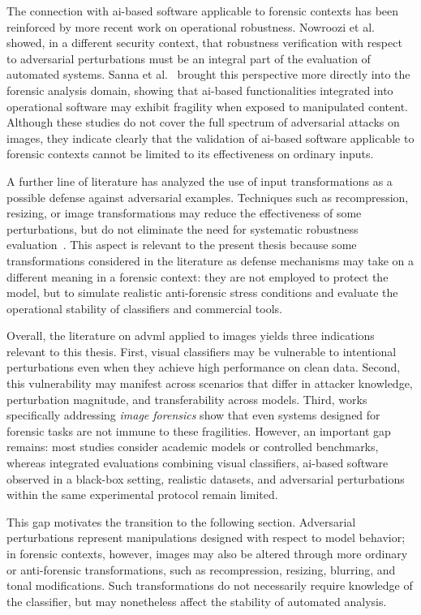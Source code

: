 The connection with \gls{ai}-based software applicable to forensic contexts has
been reinforced by more recent work on operational robustness. Nowroozi et
al.~\cite{nowroozi2024verifying} showed, in a different security context, that
robustness verification with respect to adversarial perturbations must be an
integral part of the evaluation of automated systems. Sanna et
al.~\cite{sanna2024preliminary,sanna2025pixelperfect} brought this perspective
more directly into the forensic analysis domain, showing that \gls{ai}-based
functionalities integrated into operational software may exhibit fragility when
exposed to manipulated content. Although these studies do not cover the full
spectrum of adversarial attacks on images, they indicate clearly that the
validation of \gls{ai}-based software applicable to forensic contexts cannot be
limited to its effectiveness on ordinary inputs.

A further line of literature has analyzed the use of input transformations as a
possible defense against adversarial examples. Techniques such as
recompression, resizing, or image transformations may reduce the effectiveness
of some perturbations, but do not eliminate the need for systematic robustness
evaluation~\cite{guo2017countering}. This aspect is relevant to the present
thesis because some transformations considered in the literature as defense
mechanisms may take on a different meaning in a forensic context: they are not
employed to protect the model, but to simulate realistic anti-forensic stress
conditions and evaluate the operational stability of classifiers and commercial
tools.

Overall, the literature on \gls{advml} applied to images yields three
indications relevant to this thesis. First, visual classifiers may be
vulnerable to intentional perturbations even when they achieve high performance
on clean data. Second, this vulnerability may manifest across scenarios that
differ in attacker knowledge, perturbation magnitude, and transferability
across models. Third, works specifically addressing \textit{image forensics}
show that even systems designed for forensic tasks are not immune to these
fragilities. However, an important gap remains: most studies consider academic
models or controlled benchmarks, whereas integrated evaluations combining
visual classifiers, \gls{ai}-based software observed in a black-box setting,
realistic datasets, and adversarial perturbations within the same experimental
protocol remain limited.

This gap motivates the transition to the following section. Adversarial
perturbations represent manipulations designed with respect to model behavior;
in forensic contexts, however, images may also be altered through more ordinary
or anti-forensic transformations, such as recompression, resizing, blurring,
and tonal modifications. Such transformations do not necessarily require
knowledge of the classifier, but may nonetheless affect the stability of
automated analysis.


